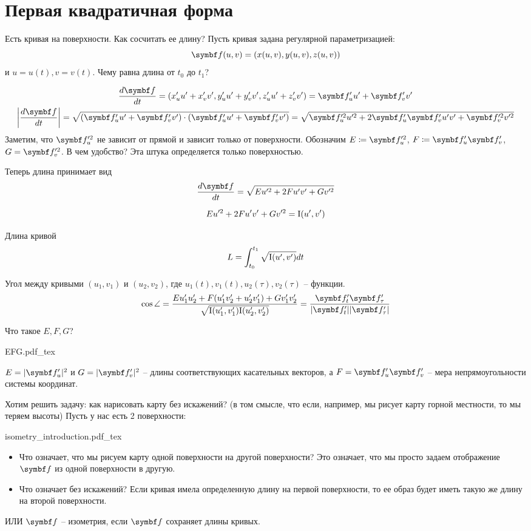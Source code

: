 \documentclass[main]{subfiles}
\begin{document}
\chapter{Первая квадратичная форма}
Есть кривая на поверхности. Как сосчитать ее длину?
Пусть кривая задана регулярной параметризацией:
\[\vf(u,v) = (x(u,v), y(u,v), z(u,v))\]
и $u = u(t), v = v(t)$.
Чему равна длина от $t_0$ до $t_1$?

\begin{gather*}
    \frac{d\vf}{dt} = (x_u' u' + x_v' v', y_u' u' + y_v' v', z_u' u' + z_v' v') = \vf_u' u' + \vf_v' v'\\
    \left| \frac{d\vf}{dt} \right| = \sqrt{(\vf_u' u' + \vf_v' v') \cdot (\vf_u' u' + \vf_v' v')} = \sqrt{\vf_u'^2 u'^2 + 2 \vf_u'\vf_v' u'v' + \vf_v'^2 v'^2}
\end{gather*}
Заметим, что $\vf_u'^2$ не зависит от прямой и зависит только от поверхности.
Обозначим $E \coloneqq \vf_u'^2$, $F \coloneqq \vf_u' \vf_v'$, $G = \vf_v'^2$.
В чем удобство? Эта штука определяется только поверхностью.

Теперь длина принимает вид
\[\frac{d\vf}{dt} = \sqrt{E u'^2 + 2Fu'v' + Gv'^2}\]
\begin{definition}
    \[Eu'^2 + 2F u'v' + G v'^2 = \mathrm{I}(u',v')\]
\end{definition}
\begin{theorem}
    Длина кривой
    \[L = \int_{t_0}^{t_1} \sqrt{\mathrm{I}(u', v')} dt\]
\end{theorem}
\begin{theorem}
    Угол между кривыми $(u_1, v_1)$ и $(u_2, v_2)$, где
    $u_1(t), v_1(t), u_2(\tau), v_2(\tau)$ -- функции.
    \[\cos\angle = \frac{Eu_1' u_2' + F(u_1' v_2' + u_2' v_1') + G v_1' v_2'}{\sqrt{\fff(u_1', v_1')\fff(u_2', v_2')}} = \frac{\vf_t' \vf_\tau '}{|\vf_t'| |\vf_\tau'|}\]
\end{theorem}

Что такое $E, F, G$?
\begin{center}
    {EFG.pdf_tex}
\end{center}
$E = |\vf_u'|^2$ и $G = |\vf_v'|^2$ -- длины соответствующих касательных векторов, а
$F = \vf_u' \vf_v'$ -- мера непрямоугольности системы координат.

Хотим решить задачу: как нарисовать карту без искажений? 
(в том смысле, что если, например, мы рисует карту горной местности, то мы теряем высоты)
Пусть у нас есть 2 поверхности:
\begin{center}
    {isometry_introduction.pdf_tex}
\end{center}
\begin{itemize}
    \item Что означает, что мы рисуем карту одной поверхности на другой поверхности?
          Это означает, что мы просто задаем отображение $\vf$ из одной поверхности в другую.
    \item Что означает без искажений?
          Если кривая имела определенную длину на первой поверхности, то ее образ будет иметь такую же длину на второй поверхности.
\end{itemize}
ИЛИ $\vf$ -- изометрия, если $\vf$ сохраняет длины кривых.
\end{document}
